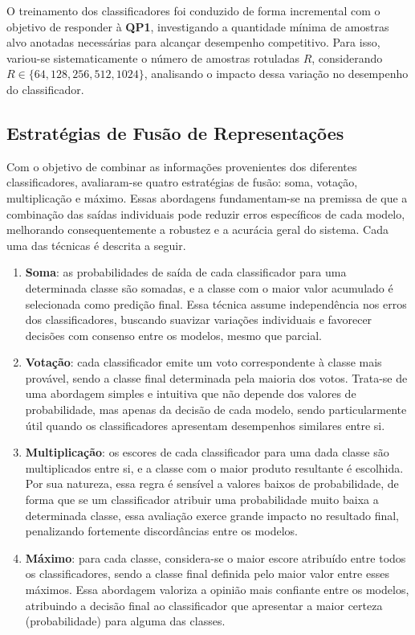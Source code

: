 \documentclass{article}
\begin{document}
O treinamento dos classificadores foi conduzido de forma incremental com o objetivo de responder à \textbf{QP1}, investigando a quantidade mínima de amostras alvo anotadas necessárias para alcançar desempenho competitivo. Para isso, variou-se sistematicamente o número de amostras rotuladas $R$, considerando $R \in \{64, 128, 256, 512, 1024\}$, analisando o impacto dessa variação no desempenho do classificador.

\subsection{Estratégias de Fusão de Representações}\label{subsec:fusao}

Com o objetivo de combinar as informações provenientes dos diferentes classificadores, avaliaram-se quatro estratégias de fusão: soma, votação, multiplicação e máximo. Essas abordagens fundamentam-se na premissa de que a combinação das saídas individuais pode reduzir erros específicos de cada modelo, melhorando consequentemente a robustez e a acurácia geral do sistema. Cada uma das técnicas é descrita a seguir.

\begin{enumerate}
    \item \textbf{Soma}: as probabilidades de saída de cada classificador para uma determinada classe são somadas, e a classe com o maior valor acumulado é selecionada como predição final. Essa técnica assume independência nos erros dos classificadores, buscando suavizar variações individuais e favorecer decisões com consenso entre os modelos, mesmo que parcial.
    
    \item \textbf{Votação}: cada classificador emite um voto correspondente à classe mais provável, sendo a classe final determinada pela maioria dos votos. Trata-se de uma abordagem simples e intuitiva que não depende dos valores de probabilidade, mas apenas da decisão de cada modelo, sendo particularmente útil quando os classificadores apresentam desempenhos similares entre si.
    
    \item \textbf{Multiplicação}: os escores de cada classificador para uma dada classe são multiplicados entre si, e a classe com o maior produto resultante é escolhida. Por sua natureza, essa regra é sensível a valores baixos de probabilidade, de forma que se um classificador atribuir uma probabilidade muito baixa a determinada classe, essa avaliação exerce grande impacto no resultado final, penalizando fortemente discordâncias entre os modelos.
    
    \item \textbf{Máximo}: para cada classe, considera-se o maior escore atribuído entre todos os classificadores, sendo a classe final definida pelo maior valor entre esses máximos. Essa abordagem valoriza a opinião mais confiante entre os modelos, atribuindo a decisão final ao classificador que apresentar a maior certeza (probabilidade) para alguma das classes.
\end{enumerate}
\end{document}
